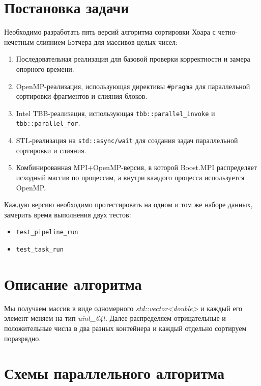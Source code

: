 \documentclass[a4paper,12pt]{article}
\begin{document}
\section{Постановка задачи}
\hspace*{1.25em}Необходимо разработать пять версий алгоритма сортировки Хоара с четно-нечетным слиянием Бэтчера для массивов целых чисел:
\begin{enumerate}
    \item Последовательная реализация для базовой проверки корректности и замера опорного времени.
    \item OpenMP-реализация, использующая директивы \texttt{\#pragma} для параллельной сортировки фрагментов и слияния блоков.
    \item Intel TBB-реализация, использующая \texttt{tbb::parallel\_invoke} и \texttt{tbb::parallel\_for}.
    \item STL-реализация на \texttt{std::async/wait} для создания задач параллельной сортировки и слияния.
    \item Комбинированная MPI+OpenMP-версия, в которой Boost.MPI распределяет исходный массив по процессам, а внутри каждого процесса используется OpenMP.
\end{enumerate}

\hspace*{1.25em}Каждую версию необходимо протестировать на одном и том же наборе данных, замерить время выполнения двух тестов:
\begin{itemize}
    \item \texttt{test\_pipeline\_run}
    \item \texttt{test\_task\_run}
\end{itemize}
\newpage


\section{Описание алгоритма}
Мы получаем массив в виде одномерного \textit{std::vector<double>} и каждый его элемент меняем на тип \textit{\normalsize uint\_64t}. Далее распределяем отрицательные и положительные числа в два разных контейнера и каждый отдельно сортируем поразрядно.
\newpage


\section{Схемы параллельного алгоритма}
\end{document}
